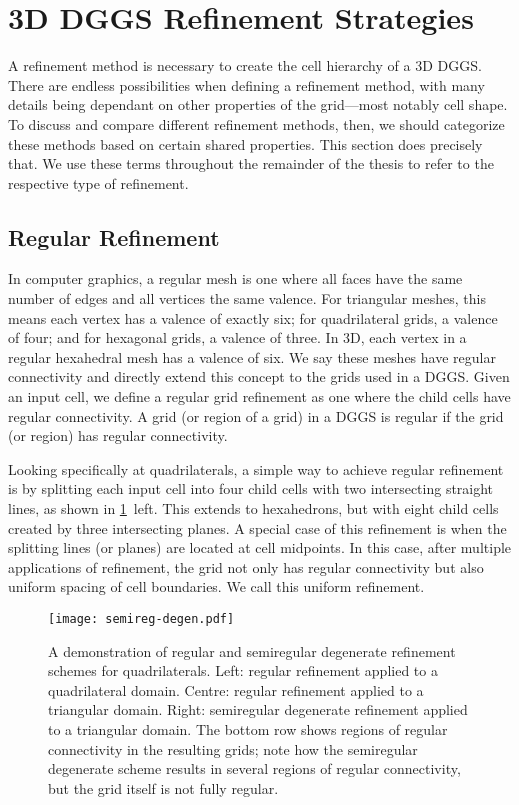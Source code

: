 \section{3D DGGS Refinement Strategies} \label{chap:3:refinement}
A refinement method is necessary to create the cell hierarchy of a 3D DGGS.
There are endless possibilities when defining a refinement method, with many details being dependant on other properties of the grid---most notably cell shape.
To discuss and compare different refinement methods, then, we should categorize these methods based on certain shared properties.
This section does precisely that.
We use these terms throughout the remainder of the thesis to refer to the respective type of refinement.


\subsection{Regular Refinement} \label{chap:3:regular}
In computer graphics, a regular mesh is one where all faces have the same number of edges and all vertices the same valence.
For triangular meshes, this means each vertex has a valence of exactly six; for quadrilateral grids, a valence of four; and for hexagonal grids, a valence of three.
In 3D, each vertex in a regular hexahedral mesh has a valence of six.
We say these meshes have regular connectivity and directly extend this concept to the grids used in a DGGS.
Given an input cell, we define a regular grid refinement as one where the child cells have regular connectivity.
A grid (or region of a grid) in a DGGS is regular if the grid (or region) has regular connectivity. 


Looking specifically at quadrilaterals, a simple way to achieve regular refinement is by splitting each input cell into four child cells with two intersecting straight lines, as shown in \cref{fig:semireg-degen}~left.
This extends to hexahedrons, but with eight child cells created by three intersecting planes.
A special case of this refinement is when the splitting lines (or planes) are located at cell midpoints.
In this case, after multiple applications of refinement, the grid not only has regular connectivity but also uniform spacing of cell boundaries.
We call this uniform refinement.


\begin{figure}[ht!]
	\centering
	\texttt{[image: semireg-degen.pdf]}
	\caption[Comparison of regular and semiregular degenerate refinement]{
		A demonstration of regular and semiregular degenerate refinement schemes for quadrilaterals.
		Left: regular refinement applied to a quadrilateral domain.
		Centre: regular refinement applied to a triangular domain.
		Right: semiregular degenerate refinement applied to a triangular domain.
		The bottom row shows regions of regular connectivity in the resulting grids; note how the semiregular degenerate scheme results in several regions of regular connectivity, but the grid itself is not fully regular.
	}
	\label{fig:semireg-degen}
\end{figure}


